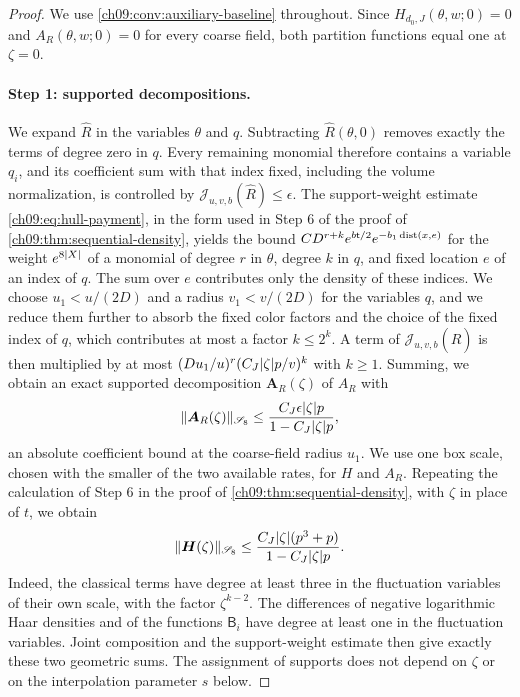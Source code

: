 \begin{proof}
We use \cref{ch09:conv:auxiliary-baseline} throughout. Since $H_{d_0,J}(\theta,w;0)=0$ and $A_R(\theta,w;0)=0$ for every coarse field, both partition functions equal one at $\zeta=0$.

\paragraph{Step 1: supported decompositions.}
We expand $\widehat R$ in the variables $\theta$ and $q$. Subtracting $\widehat R(\theta,0)$ removes exactly the terms of degree zero in $q$. Every remaining monomial therefore contains a variable $q_i$, and its coefficient sum with that index fixed, including the volume normalization, is controlled by $\mathcal J_{u,v,b}(\widehat R)\le\epsilon$. The support-weight estimate \eqref{ch09:eq:hull-payment}, in the form used in Step 6 of the proof of \cref{ch09:thm:sequential-density}, yields the bound $CD^{r+k}e^{b\mathsf t/2}e^{-b_1\operatorname{dist}(x,e)}$ for the weight $e^{8\lvert X\rvert}$ of a monomial of degree $r$ in $\theta$, degree $k$ in $q$, and fixed location $e$ of an index of $q$. The sum over $e$ contributes only the density of these indices. We choose $u_1<u/(2D)$ and a radius $v_1<v/(2D)$ for the variables $q$, and we reduce them further to absorb the fixed color factors and the choice of the fixed index of $q$, which contributes at most a factor $k\le2^k$. A term of $\mathcal J_{u,v,b}(\widehat R)$ is then multiplied by at most $(Du_1/u)^r(C_J\lvert \zeta\rvert p/v)^k$ with $k\ge1$. Summing, we obtain an exact supported decomposition $\boldsymbol A_R(\zeta)$ of $A_R$ with
\begin{equation}\label{ch09:eq:insertion-norm}
 \lVert \boldsymbol A_R(\zeta)\rVert_{\mathscr S_8}\le\frac{C_J\epsilon\lvert \zeta\rvert p}{1-C_J\lvert \zeta\rvert p},
\end{equation}
an absolute coefficient bound at the coarse-field radius $u_1$. We use one box scale, chosen with the smaller of the two available rates, for $H$ and $A_R$. Repeating the calculation of Step 6 in the proof of \cref{ch09:thm:sequential-density}, with $\zeta$ in place of $t$, we obtain
\begin{equation}\label{ch09:eq:auxiliary-baseline-norm}
 \lVert \boldsymbol H(\zeta)\rVert_{\mathscr S_8}\le\frac{C_J\lvert \zeta\rvert(p^3+p)}{1-C_J\lvert \zeta\rvert p}.
\end{equation}
Indeed, the classical terms have degree at least three in the fluctuation variables of their own scale, with the factor $\zeta^{k-2}$. The differences of negative logarithmic Haar densities and of the functions $\mathsf B_i$ have degree at least one in the fluctuation variables. Joint composition and the support-weight estimate then give exactly these two geometric sums. The assignment of supports does not depend on $\zeta$ or on the interpolation parameter $s$ below.


\end{proof}

